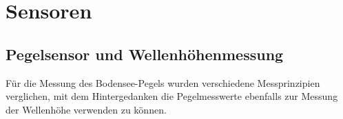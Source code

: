 \section{Sensoren}


\subsection{Pegelsensor und Wellenhöhenmessung}

Für die Messung des Bodensee-Pegels wurden verschiedene Messprinzipien verglichen, mit dem Hintergedanken die Pegelmesswerte ebenfalls zur Messung der Wellenhöhe verwenden zu können.

